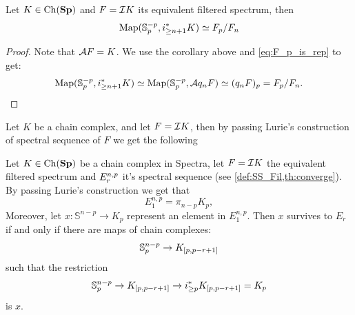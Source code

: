 \begin{lem}\label{lem:FpFn_is_rep}
    Let $K \in \operatorname{Ch}(\mathbf{Sp})$ and $F = \mathcal{I} K$ its equivalent filtered spectrum, then
    \begin{equation*}
        \operatorname{Map}(\mathbb{S}^{-p}_p, i_{\geq n+1 }^* K) \simeq F_p/F_n
    \end{equation*}
\end{lem}
\begin{proof}
    Note that $\mathcal{A} F = K$. We use the corollary above and \cref{eq:F_p_is_rep} to get:
    \begin{equation*}
        \operatorname{Map}(\mathbb{S}^{-p}_p, i_{\geq n+1 }^* K) \simeq \operatorname{Map}(\mathbb{S}^{-p}_p, \mathcal{A} q_n F) \simeq (q_n F)_p = F_p/F_n.
    \end{equation*}
\end{proof}

Let $K$ be a chain complex, and let $F = \mathcal{I} K$, then by passing Lurie's construction of spectral sequence of $F$ we get the following
\begin{prop}\label{lem:ChSur}
    Let $K \in \operatorname{Ch}(\mathbf{Sp})$ be a chain complex in Spectra, let $F = \mathcal{I} K$ the equivalent filtered spectrum and $E_r^{n,p}$ it's spectral sequence (see \cref{def:SS_Fil,th:converge}). By passing Lurie's construction we get that
    \begin{equation*}
        E_1^{n,p} = \pi_{n - p} K_p,
    \end{equation*}
    Moreover, let $x\colon \mathbb{S}^{n - p} \to K_p$ represent an element in $E_1^{n,p}$. Then $x$ survives to $E_r$ if and only if there are maps of chain complexes:
    \[
        \mathbb{S}^{n-p}_p \to K_{[p,p-r+1]}
    \]
    such that the restriction
    \[
        \mathbb{S}^{n-p}_p \to K_{[p,p-r+1]} \to i_{\geq p}^* K_{[p,p-r+1]} = K_p
    \]
    is $x$.
\end{prop}

